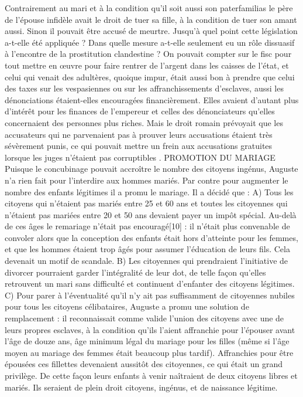  Contrairement au mari et à la condition qu'il soit aussi son paterfamilias le père de l'épouse infidèle avait le droit de tuer sa fille, à la condition de tuer son amant aussi. Sinon il pouvait être accusé de meurtre.
 Jusqu'à quel point cette législation a-t-elle été appliquée ? Dans quelle mesure a-t-elle seulement eu un rôle dissuasif à l'encontre de la prostitution clandestine ? On pouvait compter sur le fisc pour tout mettre en œuvre pour faire rentrer de l'argent dans les caisses de l'état, et celui qui venait des adultères, quoique impur, était aussi bon à prendre que celui des taxes sur les vespasiennes ou sur les affranchissements d'esclaves, aussi les dénonciations étaient-elles encouragées financièrement. Elles avaient d'autant plus d'intérêt pour les finances de l'empereur et celles des dénonciateurs qu'elles concernaient des personnes plus riches. Mais le droit romain prévoyait que les accusateurs qui ne parvenaient pas à prouver leurs accusations étaient très sévèrement punis, ce qui pouvait mettre un frein aux accusations gratuites lorsque les juges n'étaient pas corruptibles . 
PROMOTION DU MARIAGE
 Puisque le concubinage pouvait accroître le nombre des citoyens ingénus, Auguste n'a rien fait pour l'interdire aux hommes mariés. Par contre pour augmenter le nombre des enfants légitimes il a promu le mariage. Il a décidé que : 
 A) Tous les citoyens qui n'étaient pas mariés entre 25 et 60 ans et toutes les citoyennes qui n'étaient pas mariées entre 20 et 50 ans devaient payer un impôt spécial. Au-delà de ces âges le remariage n'était pas encouragé[10] : il n'était plus convenable de convoler alors que la conception des enfants était hors d'atteinte pour les femmes, et que les hommes étaient trop âgés pour assumer l'éducation de leurs fils. Cela devenait un motif de scandale. 
 B) Les citoyennes qui prendraient l'initiative de divorcer pourraient garder l'intégralité de leur dot, de telle façon qu'elles retrouvent un mari sans difficulté et continuent d'enfanter des citoyens légitimes. 
 C) Pour parer à l'éventualité qu'il n'y ait pas suffisamment de citoyennes nubiles pour tous les citoyens célibataires, Auguste a promu une solution de remplacement : il reconnaissait comme valide l'union des citoyens avec une de leurs propres esclaves, à la condition qu'ils l'aient affranchie pour l'épouser avant l'âge de douze ans, âge minimum légal du mariage pour les filles (même si l'âge moyen au mariage des femmes était beaucoup plus tardif). Affranchies pour être épousées ces fillettes devenaient aussitôt des citoyennes, ce qui était un grand privilège. De cette façon leurs enfants à venir naîtraient de deux citoyens libres et mariés. Ils seraient de plein droit citoyens, ingénus, et de naissance légitime. 
